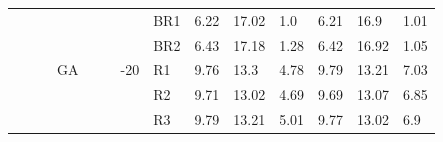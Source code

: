 {\begin{minipage}{\linewidth}
\begin{tabular}{l|l|l|l|c|c|r|l|lll|lll}
  \cline{4-4}\cline{7-14}
                                              &                                          &                                           & \multirow{8}{*}{GA}                       &                                            &                                                                                         & \multirow{8}{*}{-20}                                                                           & BR1                                       & 6.22  & 17.02 & 1.0       & 6.21  & 16.9  & 1.01       \\
                                              &                                          &                                           &                                           &                                            &                                                                                         &                                                                                                & BR2                                       & 6.43  & 17.18 & 1.28      & 6.42  & 16.92 & 1.05       \\
                                              &                                          &                                           &                                           &                                            &                                                                                         &                                                                                                & R1                                        & 9.76  & 13.3  & 4.78      & 9.79  & 13.21 & 7.03       \\
                                              &                                          &                                           &                                           &                                            &                                                                                         &                                                                                                & R2                                        & 9.71  & 13.02 & 4.69      & 9.69  & 13.07 & 6.85       \\
                                              &                                          &                                           &                                           &                                            &                                                                                         &                                                                                                & R3                                        & 9.79  & 13.21 & 5.01      & 9.77  & 13.02 & 6.9        \\

\end{tabular}
\end{minipage}}
